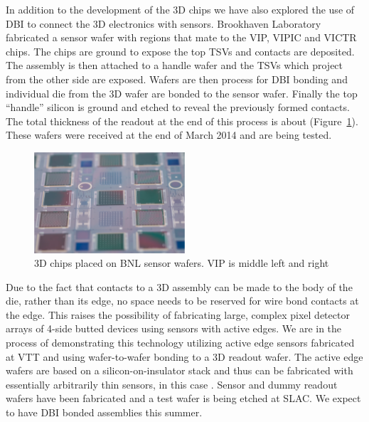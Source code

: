 In addition to the development of the 3D chips we have also explored the use of DBI to connect the 3D electronics with sensors.  Brookhaven Laboratory fabricated a sensor wafer with regions that mate to the VIP, VIPIC and VICTR chips.  The chips are ground to expose the top TSVs and contacts are deposited. The assembly is then attached to a handle wafer and the TSVs which project from the other side are exposed.  Wafers are then process for DBI bonding and individual die from the 3D wafer are bonded to the sensor wafer.  Finally the top ``handle'' silicon is ground and etched to reveal the previously formed contacts.  The total thickness of the readout at the end of this process is about \unit[25]{\micron} (Figure~\ref{fig:VertexDetector:VIP:chipsOnBNLWafer}). These wafers were received at the end of March 2014 and are being tested.
\begin{figure}
    \centering
    \includegraphics[width=0.5\textwidth]{VertexDetector/VIP/3DChipsOnBNLWafers}
\caption{3D chips placed on BNL sensor wafers. VIP is middle left and right}
\label{fig:VertexDetector:VIP:chipsOnBNLWafer}
\end{figure}
Due to the fact that contacts to a 3D assembly can be made to the body of the die, rather than its edge, no space needs to be reserved for wire bond contacts at the edge.  This raises the possibility of fabricating large, complex pixel detector arrays of 4-side butted devices using sensors with active edges.  We are in the process of demonstrating this technology utilizing active edge sensors fabricated at VTT and using wafer-to-wafer bonding to a 3D readout wafer. The active edge wafers are based on a silicon-on-insulator stack and thus can be fabricated with essentially arbitrarily thin sensors, in this case \unit[200]{\micron}. Sensor and dummy readout wafers have been fabricated and a test wafer is being etched at SLAC. We expect to have DBI bonded assemblies this summer.

